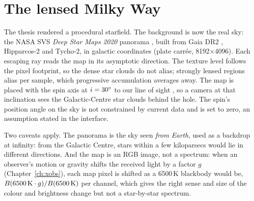 \section{The lensed Milky Way}
\label{sec:sky}

The thesis rendered a procedural starfield. The background is now the real
sky: the NASA SVS \emph{Deep Star Maps 2020} panorama \citep{Wright2020},
built from Gaia DR2 \citep{Gaia2018}, Hipparcos-2 and Tycho-2, in galactic
coordinates (plate carr\'ee, 8192$\times$4096). Each escaping ray reads the
map in its asymptotic direction. The texture level follows the pixel
footprint, so the dense star clouds do not alias; strongly lensed regions
alias per sample, which progressive accumulation averages away. The map is
placed with the spin axis at $i = 30^\circ$ to our line of sight
\citep{EHT2022}, so a camera at that inclination sees the Galactic-Centre
star clouds behind the hole. The spin's position angle on the sky is not
constrained by current data and is set to zero, an assumption stated in the
interface.

Two caveats apply. The panorama is the sky seen \emph{from Earth}, used as a
backdrop at infinity: from the Galactic Centre, stars within a few
kiloparsecs would lie in different directions. And the map is an RGB image,
not a spectrum: when an observer's motion or gravity shifts the received
light by a factor $g$ (Chapter~\ref{ch:xobs}), each map pixel is shifted as a
6500\,K blackbody would be, $B(6500\,{\rm K}\cdot g)/B(6500\,{\rm K})$ per
channel, which gives the right sense and size of the colour and brightness
change but not a star-by-star spectrum.
